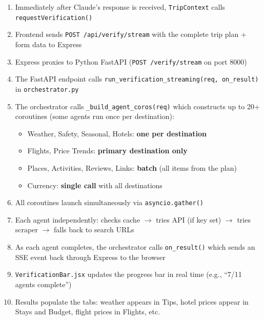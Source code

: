 \documentclass[11pt,a4paper]{article}
\begin{document}
\begin{infobox}
\begin{enumerate}[nosep]
\item Immediately after Claude's response is received, \texttt{TripContext} calls \texttt{requestVerification()}
\item Frontend sends \texttt{POST /api/verify/stream} with the complete trip plan + form data to Express
\item Express proxies to Python FastAPI (\texttt{POST /verify/stream} on port 8000)
\item The FastAPI endpoint calls \texttt{run\_verification\_streaming(req, on\_result)} in \texttt{orchestrator.py}
\item The orchestrator calls \texttt{\_build\_agent\_coros(req)} which constructs up to 20+ coroutines (some agents run once per destination):
    \begin{itemize}[nosep]
    \item Weather, Safety, Seasonal, Hotels: \textbf{one per destination}
    \item Flights, Price Trends: \textbf{primary destination only}
    \item Places, Activities, Reviews, Links: \textbf{batch} (all items from the plan)
    \item Currency: \textbf{single call} with all destinations
    \end{itemize}
\item All coroutines launch simultaneously via \texttt{asyncio.gather()}
\item Each agent independently: checks cache $\to$ tries API (if key set) $\to$ tries scraper $\to$ falls back to search URLs
\item As each agent completes, the orchestrator calls \texttt{on\_result()} which sends an SSE event back through Express to the browser
\item \texttt{VerificationBar.jsx} updates the progress bar in real time (e.g., ``7/11 agents complete'')
\item Results populate the tabs: weather appears in Tips, hotel prices appear in Stays and Budget, flight prices in Flights, etc.
\end{enumerate}
\end{infobox}
\end{document}
